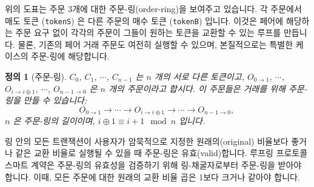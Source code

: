 \documentclass[UTF8,nofonts]{article}
\makeatletter
\newtheorem{definition}{정의}[section]
\newenvironment{figurehere}
 {\def\@captype{figure}}
 {}
\makeatother
\begin{document}
\begin{multicols}{2}
\begin{center}
\begin{figurehere}

\caption{주문 3개의 주문-링}
\label{fig:ring}
\end{figurehere}
\end{center}


위의 도표는 주문 3개에 대한 주문-링(order-ring)을 보여주고 있습니다. 각 주문에서 매도 토큰 (\verb|tokenS|) 은 다른 주문의 매수 토큰 (\verb|tokenB|) 입니다. 이것은 페어에 해당하는 주문 요구 없이 각각의 주문이 그들이 원하는 토큰을 교환할 수 있는 루프를 만듭니다. 물론, 기존의 페어 거래 주문도 여전히 실행할 수 있으며, 본질적으로는 특별한 케이스의 주문-링에 해당합니다.

\begin{definition}[주문-링] $C_{0}$, $C_{1}$, $\cdots$, $C_{n-1}$ 는 $n$ 개의 서로 다른 토큰이고, $O_{0\rightarrow 1}$, $\cdots$, $O_{i\rightarrow i\oplus 1}$, $\cdots$, $O_{n-1 \rightarrow 0}$ 은 $n$ 개의 주문이라고 합시다. 이 주문들은 거래를 위해 주문-링을 만들 수 있습니다:
$$O_{0\rightarrow 1} \rightarrow \cdots \rightarrow O_{i\rightarrow i\oplus 1} \rightarrow \cdots \rightarrow O_{n-1\rightarrow 0} \text{, }$$
$n$ 은 주문-링의 길이이며, $i\oplus 1 \equiv i+1 \mod n$ 입니다.
\end{definition}

링 안의 모든 트랜잭션이 사용자가 암묵적으로 지정한 원래의(original) 비율보다 좋거나 같은 교환 비율로 실행될 수 있을 때 주문-링은 유효(valid)합니다. 루프링 프로토콜 스마트 계약은 주문-링의 유효성을 검증하기 위해 링-채굴자로부터 주문-링을 받아야 합니다. 이때, 모든 주문에 대한 원래의 교환 비율 곱은 1보다 크거나 같아야 합니다.  


\end{multicols}
\end{document}

